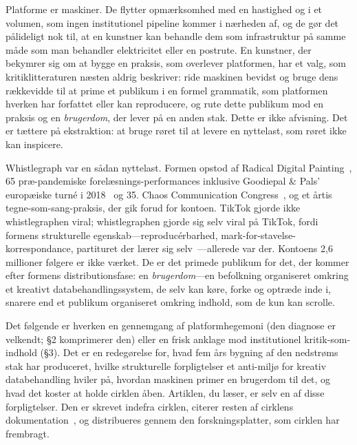 \documentclass[10pt,letterpaper,twocolumn]{article}
\begin{document}
Platforme er maskiner. De flytter opmærksomhed med en hastighed og i et volumen, som ingen institutionel pipeline kommer i nærheden af, og de gør det pålideligt nok til, at en kunstner kan behandle dem som infrastruktur på samme måde som man behandler elektricitet eller en postrute. En kunstner, der bekymrer sig om at bygge en praksis, som overlever platformen, har et valg, som kritiklitteraturen næsten aldrig beskriver: ride maskinen bevidst og bruge dens rækkevidde til at prime et publikum i en formel grammatik, som platformen hverken har forfattet eller kan reproducere, og rute dette publikum mod en praksis og en \emph{brugerdom}, der lever på en anden stak. Dette er ikke afvisning. Det er tættere på ekstraktion: at bruge røret til at levere en nyttelast, som røret ikke kan inspicere.

Whistlegraph var en sådan nyttelast. Formen opstod af Radical Digital Painting~\citep{scudder2017manifesto}, 65 præ-pandemiske forelæsnings-performances inklusive Goodiepal \& Pals' europæiske turné i 2018~\citep{scudder2026goodiepal} og 35. Chaos Communication Congress~\citep{scudder2018rdp35c3}, og et årtis tegne-som-sang-praksis, der gik forud for kontoen. TikTok gjorde ikke whistlegraphen viral; whistlegraphen gjorde sig selv viral på TikTok, fordi formens strukturelle egenskab---reproducérbarhed, mark-for-stavelse-korrespondance, partituret der lærer sig selv~\citep{scudder2026whistlegraph}---allerede var der. Kontoens 2,6 millioner følgere er ikke værket. De er det primede publikum for det, der kommer efter formens distributionsfase: en \emph{brugerdom}---en befolkning organiseret omkring et kreativt databehandlingssystem, de selv kan køre, forke og optræde inde i, snarere end et publikum organiseret omkring indhold, som de kun kan scrolle.

Det følgende er hverken en gennemgang af platformhegemoni (den diagnose er velkendt; \S2 komprimerer den) eller en frisk anklage mod institutionel kritik-som-indhold (\S3). Det er en redegørelse for, hvad fem års bygning af den nedstrøms stak har produceret, hvilke strukturelle forpligtelser et anti-miljø for kreativ databehandling hviler på, hvordan maskinen primer en brugerdom til det, og hvad det koster at holde cirklen åben. Artiklen, du læser, er selv en af disse forpligtelser. Den er skrevet indefra cirklen, citerer resten af cirklens dokumentation~\citep{scudder2026ac, scudder2026kidlisp, scudder2026notepat, scudder2026os, scudder2026pieces, scudder2026urltradition, scudder2026archaeology, scudder2026whistlegraph, scudder2026goodiepal}, og distribueres gennem den forskningsplatter, som cirklen har frembragt.
\end{document}
